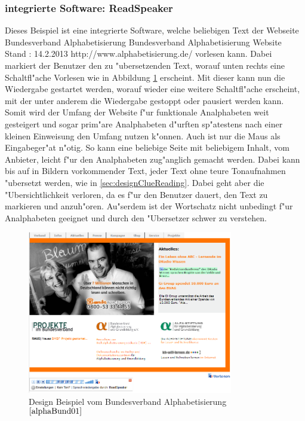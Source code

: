\subsubsection{ integrierte Software: ReadSpeaker}

Dieses Beispiel ist eine integrierte Software, welche beliebigen Text der Webseite Bundesverband Alphabetisierung
						{Bundesverband Alphabetisierung Website}
						{Stand : 14.2.2013}
						{http://www.alphabetisierung.de/}
vorlesen kann.
Dabei markiert der Benutzer den zu "ubersetzenden Text, worauf unten rechts eine Schaltfl"ache \glqq Vorlesen\grqq{} wie in Abbildung  \ref{fig:DesignBeispiel1} erscheint. Mit dieser kann nun die Wiedergabe gestartet werden, worauf wieder eine weitere Schaltfl"ache erscheint, mit der unter anderem die Wiedergabe gestoppt oder pausiert werden kann.\\
Somit wird der Umfang der Website f"ur funktionale Analphabeten weit gesteigert und sogar prim"are Analphabeten d"urften sp"atestens nach einer kleinen Einweisung den Umfang nutzen k"onnen. Auch ist nur die Maus als Eingabeger"at n"otig. So kann eine beliebige Seite mit beliebigem Inhalt, vom Anbieter, leicht f"ur den Analphabeten zug"anglich gemacht werden. Dabei kann bis auf in Bildern vorkommender Text, jeder Text ohne teure Tonaufnahmen "ubersetzt werden, wie in \ref{sec:designClueReading}. Dabei geht aber die "Ubersichtlichkeit verloren, da es f"ur den Benutzer dauert, den Text zu markieren und anzuh"oren. Au"serdem ist der Wortschatz nicht unbedingt f"ur Analphabeten geeignet und durch den "Ubersetzer schwer zu verstehen.
\begin{figure}[h]
	\centering
		\includegraphics[width=0.80\textwidth]{Daten/DesignBeispiel1.png}
	\caption{Design Beispiel vom Bundesverband Alphabetisierung $^{\ref{alphaBund01}}$}
	\label{fig:DesignBeispiel1}
\end{figure}

